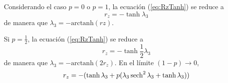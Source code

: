 Considerando el caso $p=0$ o $p=1$, la ecuación (\ref{eq:RzTanh}) se reduce a 
\begin{equation}
r_z=-\tanh{\lambda_{3}}
\end{equation}
de manera que $\lambda_{3}=-\text{arctanh}(rz)$.

Si $p=\frac{1}{2}$, la ecuación (\ref{eq:RzTanh}) se reduce a
\begin{equation}
r_z=-\tanh\frac{1}{2}\lambda_{3}
\end{equation}
de manera que $\lambda_{3}=-\text{arctanh}(2r_{z})$.
En el límite $(1-p)\rightarrow 0$,
\begin{equation}
  r_{z}=-(\tanh{\lambda_{3}}+p(\lambda_{3}\sech^{2}{\lambda_{3}}+\tanh{\lambda_{3}}))
\end{equation}
\newpage